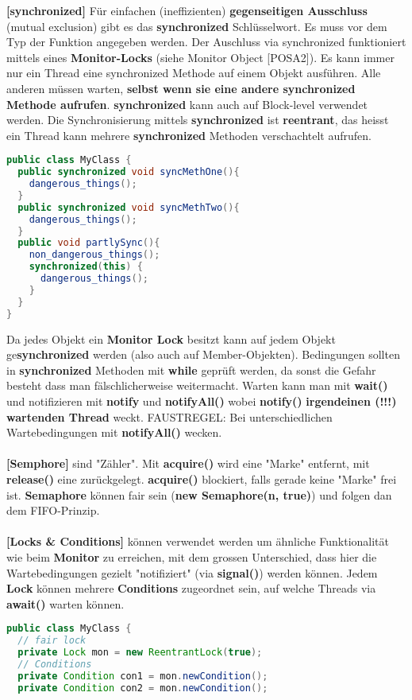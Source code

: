 \documentclass[8pt]{extarticle}
\let\oldtextbf\textbf
\renewcommand{\textbf}{\tiny\oldtextbf}
\begin{document}
\begin{multicols*}{5}
\textbf{[synchronized]} Für einfachen (ineffizienten) \textbf{gegenseitigen Ausschluss} (mutual exclusion) gibt es das \textbf{synchronized} Schlüsselwort. Es muss vor dem Typ der Funktion angegeben werden. Der Auschluss via synchronized funktioniert mittels eines \textbf{Monitor-Locks} (siehe Monitor Object [POSA2]). Es kann immer nur ein Thread eine synchronized Methode auf einem Objekt ausführen. Alle anderen müssen warten, \textbf{selbst wenn sie eine andere synchronized Methode aufrufen}. \textbf{synchronized} kann auch auf Block-level verwendet werden. Die Synchronisierung mittels \textbf{synchronized} ist \textbf{reentrant}, das heisst ein Thread kann mehrere \textbf{synchronized} Methoden verschachtelt aufrufen.
\begin{lstlisting}[language=java]
public class MyClass {
  public synchronized void syncMethOne(){
    dangerous_things();
  }
  public synchronized void syncMethTwo(){
    dangerous_things();
  }
  public void partlySync(){
    non_dangerous_things();
    synchronized(this) {
      dangerous_things();
    }
  }
}
\end{lstlisting}
Da jedes Objekt ein \textbf{Monitor Lock} besitzt kann auf jedem Objekt ge\textbf{synchronized} werden (also auch auf Member-Objekten). Bedingungen sollten in \textbf{synchronized} Methoden mit \textbf{while} geprüft werden, da sonst die Gefahr besteht dass man fälschlicherweise weitermacht. Warten kann man mit \textbf{wait()} und notifizieren mit \textbf{notify} und \textbf{notifyAll()} wobei \textbf{notify()} \textbf{irgendeinen (!!!) wartenden Thread} weckt. FAUSTREGEL: Bei unterschiedlichen Wartebedingungen mit \textbf{notifyAll()} wecken.\\\\
\textbf{[Semphore]} sind "Zähler". Mit \textbf{acquire()} wird eine "Marke" entfernt, mit \textbf{release()} eine zurückgelegt. \textbf{acquire()} blockiert, falls gerade keine "Marke" frei ist. \textbf{Semaphore} können fair sein (\textbf{new Semaphore(n, true)}) und folgen dan dem FIFO-Prinzip.\\\\
\textbf{[Locks \& Conditions]} können verwendet werden um ähnliche Funktionalität wie beim \textbf{Monitor} zu erreichen, mit dem grossen Unterschied, dass hier die Wartebedingungen gezielt "notifiziert" (via \textbf{signal()}) werden können. Jedem \textbf{Lock} können mehrere \textbf{Conditions} zugeordnet sein, auf welche Threads via \textbf{await()} warten können.
\begin{lstlisting}[language=java]
public class MyClass {
  // fair lock
  private Lock mon = new ReentrantLock(true);
  // Conditions
  private Condition con1 = mon.newCondition();
  private Condition con2 = mon.newCondition();


\end{lstlisting}
\end{multicols*}
\end{document}
